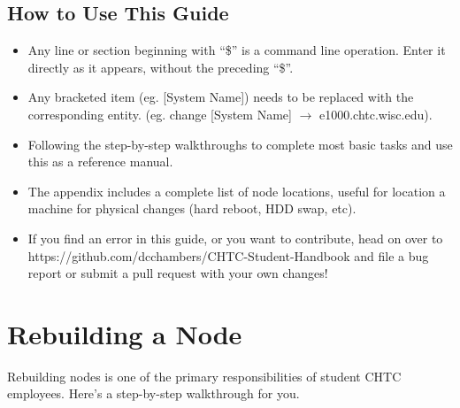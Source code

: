 \documentclass[10pt,letterpaper]{article}
\begin{document}
    \subsection{How to Use This Guide}
        \begin{itemize}
            \item Any line or section beginning with “\$” is a command line operation.
            Enter it directly as it appears, without the preceding “\$”.
            \item Any bracketed item (eg. [System Name]) needs to be replaced with
            the corresponding entity. (eg. change [System Name] $\rightarrow$
            e1000.chtc.wisc.edu).
            \item Following the step-by-step walkthroughs to complete most basic
            tasks and use this as a reference manual.
            \item The appendix includes a complete list of node locations, useful
            for location a machine for physical changes (hard reboot, HDD swap, etc).
            \item If you find an error in this guide, or you want to contribute, head on over
            to https://github.com/dcchambers/CHTC-Student-Handbook and file a bug report or
            submit a pull request with your own changes!

        \end{itemize}

\clearpage

\section{Rebuilding a Node}
    Rebuilding nodes is one of the primary responsibilities of student CHTC employees.
    Here’s a step-by-step walkthrough for you.
\end{document}
